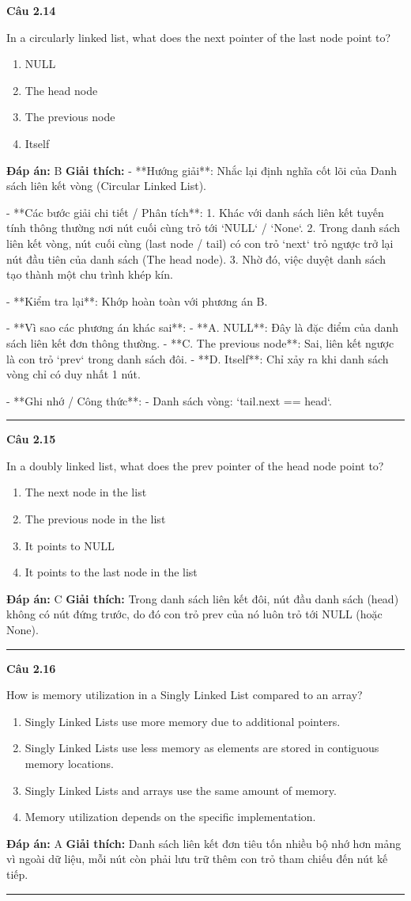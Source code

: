 \documentclass[11pt,a4paper]{article}
\newenvironment{question}[1]{%
  \par\vspace{1em}\noindent\textbf{\large Câu #1}\par\vspace{0.4em}
}{%
  \par\vspace{1em}\hrule\vspace{0.6em}
}
\newenvironment{choices}{%
  \begin{enumerate}[label=\textbf{\Alph*.},leftmargin=2.2em,itemsep=2pt,topsep=3pt]
}{%
  \end{enumerate}
}
\newcommand{\choice}{\item}
\begin{document}
\begin{question}{2.14}
In a circularly linked list, what does the next pointer of the last node point to?
\begin{choices}
\choice NULL
\choice The head node
\choice The previous node
\choice Itself
\end{choices}
\textbf{Đáp án:} B
\textbf{Giải thích:} - **Hướng giải**:
  Nhắc lại định nghĩa cốt lõi của Danh sách liên kết vòng (Circular Linked List).

- **Các bước giải chi tiết / Phân tích**:
  1. Khác với danh sách liên kết tuyến tính thông thường nơi nút cuối cùng trỏ tới `NULL` / `None`.
  2. Trong danh sách liên kết vòng, nút cuối cùng (last node / tail) có con trỏ `next` trỏ ngược trở lại nút đầu tiên của danh sách (The head node).
  3. Nhờ đó, việc duyệt danh sách tạo thành một chu trình khép kín.

- **Kiểm tra lại**:
  Khớp hoàn toàn với phương án B.

- **Vì sao các phương án khác sai**:
  - **A. NULL**: Đây là đặc điểm của danh sách liên kết đơn thông thường.
  - **C. The previous node**: Sai, liên kết ngược là con trỏ `prev` trong danh sách đôi.
  - **D. Itself**: Chỉ xảy ra khi danh sách vòng chỉ có duy nhất 1 nút.

- **Ghi nhớ / Công thức**:
  - Danh sách vòng: `tail.next == head`.
\end{question}

\begin{question}{2.15}
In a doubly linked list, what does the prev pointer of the head node point to?
\begin{choices}
\choice The next node in the list
\choice The previous node in the list
\choice It points to NULL
\choice It points to the last node in the list
\end{choices}
\textbf{Đáp án:} C
\textbf{Giải thích:} Trong danh sách liên kết đôi, nút đầu danh sách (head) không có nút đứng trước, do đó con trỏ prev của nó luôn trỏ tới NULL (hoặc None).
\end{question}

\begin{question}{2.16}
How is memory utilization in a Singly Linked List compared to an array?
\begin{choices}
\choice Singly Linked Lists use more memory due to additional pointers.
\choice Singly Linked Lists use less memory as elements are stored in contiguous memory locations.
\choice Singly Linked Lists and arrays use the same amount of memory.
\choice Memory utilization depends on the specific implementation.
\end{choices}
\textbf{Đáp án:} A
\textbf{Giải thích:} Danh sách liên kết đơn tiêu tốn nhiều bộ nhớ hơn mảng vì ngoài dữ liệu, mỗi nút còn phải lưu trữ thêm con trỏ tham chiếu đến nút kế tiếp.
\end{question}
\end{document}
